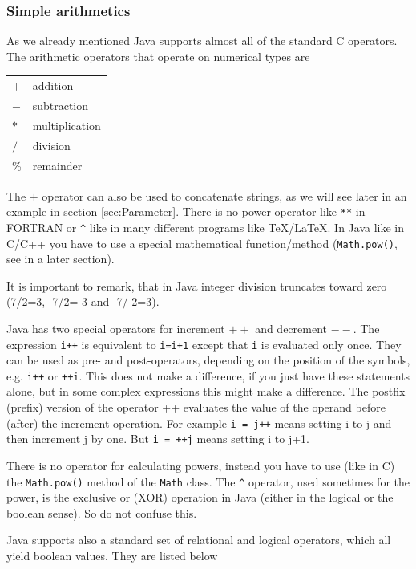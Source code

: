 \subsubsection{Simple arithmetics}
As we already mentioned Java  supports almost all of the standard
C operators. The arithmetic operators that operate on numerical types
are 
\begin{center}
\begin{tabular}{ll}
$+$ & addition \\
$-$ & subtraction                 \\
$*$ & multiplication \\
$/$ & division \\
\% & remainder
\end{tabular}
\end{center}
The $+$ operator can also be used to concatenate strings, as we will
see later in an example in section \ref{sec:Parameter}.
There is no power operator like \verb|**| in FORTRAN or \verb|^| like in many
different programs like TeX/LaTeX. In Java like in C/C++ you have to use
a special mathematical function/method 
(\verb|Math.pow()|, see in a later section).

It is important to remark, that in Java integer division truncates
toward zero (7/2=3, -7/2=-3 and -7/-2=3).

Java has two special operators for increment $++$ and decrement $--$. The 
expression \verb|i++| is equivalent to \verb|i=i+1| except that
\verb|i| is evaluated only once. They can be used as pre- and post-operators,
depending on the position of the symbols, e.g. \verb|i++| or \verb|++i|.
This does not make a difference, if you just have these statements
alone, but in some complex expressions this might make a difference.
The postfix (prefix) version of the operator ++ evaluates  the value
of the operand before (after) the increment operation.
For example \verb|i = j++| means setting i to j and then increment j by one.
But \verb|i = ++j| means setting i to j+1.

There is no operator for calculating powers, instead you have to use
(like in C) the \verb|Math.pow()| method of the \verb|Math| class.
The \verb|^| operator, used sometimes for the power, is the exclusive
or (XOR) operation in Java (either in the logical or the boolean sense). 
So do not confuse this. 

Java supports also a standard set of relational and logical operators,
which all yield boolean values. They are listed below

